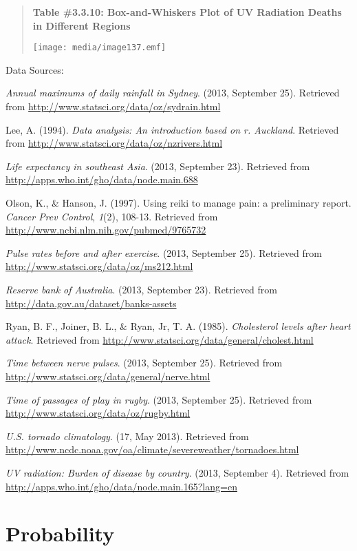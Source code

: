 \documentclass[]{book}
\begin{document}
\begin{quote}
\textbf{Table \#3.3.10: Box-and-Whiskers Plot of UV Radiation Deaths in
Different Regions}

\texttt{[image: media/image137.emf]}
\end{quote}

Data Sources:

\emph{Annual maximums of daily rainfall in Sydney}. (2013, September 25).
Retrieved from \url{http://www.statsci.org/data/oz/sydrain.html}

Lee, A. (1994). \emph{Data analysis: An introduction based on r. Auckland}.
Retrieved from \url{http://www.statsci.org/data/oz/nzrivers.html}

\emph{Life expectancy in southeast Asia}. (2013, September 23). Retrieved
from \url{http://apps.who.int/gho/data/node.main.688}

Olson, K., \& Hanson, J. (1997). Using reiki to manage pain: a
preliminary report. \emph{Cancer Prev Control}, \emph{1}(2), 108-13. Retrieved
from \url{http://www.ncbi.nlm.nih.gov/pubmed/9765732}

\emph{Pulse rates before and after exercise}. (2013, September 25). Retrieved
from \url{http://www.statsci.org/data/oz/ms212.html}

\emph{Reserve bank of Australia}. (2013, September 23). Retrieved from
\url{http://data.gov.au/dataset/banks-assets}

Ryan, B. F., Joiner, B. L., \& Ryan, Jr, T. A. (1985). \emph{Cholesterol
levels after heart attack}. Retrieved from
\url{http://www.statsci.org/data/general/cholest.html}

\emph{Time between nerve pulses}. (2013, September 25). Retrieved from
\url{http://www.statsci.org/data/general/nerve.html}

\emph{Time of passages of play in rugby}. (2013, September 25). Retrieved
from \url{http://www.statsci.org/data/oz/rugby.html}

\emph{U.S. tornado climatology}. (17, May 2013). Retrieved from
\url{http://www.ncdc.noaa.gov/oa/climate/severeweather/tornadoes.html}

\emph{UV radiation: Burden of disease by country}. (2013, September 4).
Retrieved from \url{http://apps.who.int/gho/data/node.main.165?lang=en}

\hypertarget{probability}{%
\chapter{Probability}\label{probability}}
\end{document}
